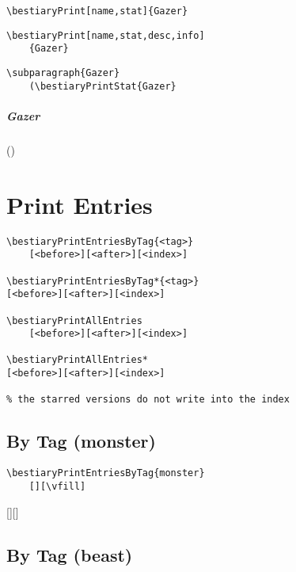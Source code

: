 \documentclass[itdr]{subfiles}
\begin{document}

\vfill

\begin{lstlisting}
\bestiaryPrint[name,stat]{Gazer}
\end{lstlisting}


\vfill
\break

\begin{lstlisting}
\bestiaryPrint[name,stat,desc,info]
	{Gazer}
\end{lstlisting}


\begin{lstlisting}
\subparagraph{Gazer}
	(\bestiaryPrintStat{Gazer}
\end{lstlisting}

\subparagraph{Gazer} ()

\vfill
\clearpage

\section{Print Entries}

\begin{lstlisting}
\bestiaryPrintEntriesByTag{<tag>}
	[<before>][<after>][<index>]

\bestiaryPrintEntriesByTag*{<tag>}
[<before>][<after>][<index>]

\bestiaryPrintAllEntries
	[<before>][<after>][<index>]

\bestiaryPrintAllEntries*
[<before>][<after>][<index>]

% the starred versions do not write into the index
\end{lstlisting}

\subsection{By Tag (monster)}

\begin{lstlisting}
\bestiaryPrintEntriesByTag{monster}
	[][\vfill]
\end{lstlisting}

[][\vfill]


\subsection{By Tag (beast)}
\end{document}

